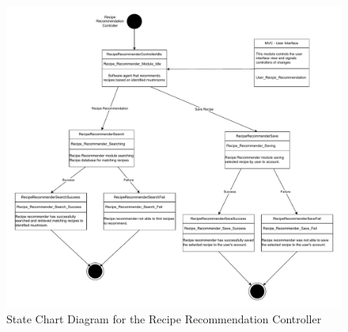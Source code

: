 \documentclass[]{article}
\begin{document}
\begin{figure}[H]
    \centering
    \includegraphics[width=\textwidth]{SE3A04_D3_Diagram_Omar-Page-2.drawio.pdf}
    \caption{State Chart Diagram for the Recipe Recommendation Controller}
\end{figure}

\end{document}
